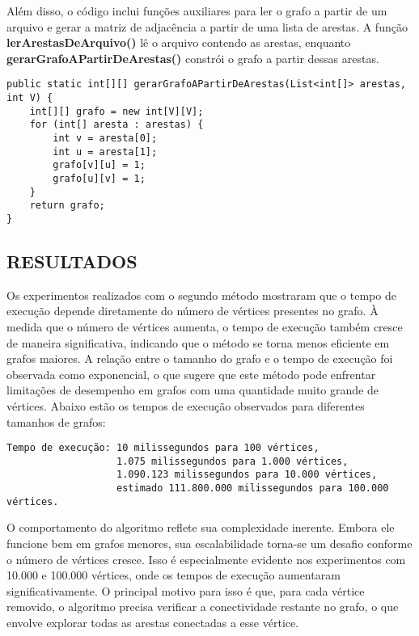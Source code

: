 Além disso, o código inclui funções auxiliares para ler o grafo a partir de um arquivo e gerar a matriz de adjacência a partir de uma lista de arestas. A função \textbf{lerArestasDeArquivo()} lê o arquivo contendo as arestas, enquanto \textbf{gerarGrafoAPartirDeArestas()} constrói o grafo a partir dessas arestas.

\begin{verbatim}
public static int[][] gerarGrafoAPartirDeArestas(List<int[]> arestas, int V) {
    int[][] grafo = new int[V][V];
    for (int[] aresta : arestas) {
        int v = aresta[0];
        int u = aresta[1];
        grafo[v][u] = 1;
        grafo[u][v] = 1;
    }
    return grafo;
}
\end{verbatim}

\subsection{\esp RESULTADOS}

Os experimentos realizados com o segundo método mostraram que o tempo de execução depende diretamente do número de vértices presentes no grafo. À medida que o número de vértices aumenta, o tempo de execução também cresce de maneira significativa, indicando que o método se torna menos eficiente em grafos maiores. A relação entre o tamanho do grafo e o tempo de execução foi observada como exponencial, o que sugere que este método pode enfrentar limitações de desempenho em grafos com uma quantidade muito grande de vértices. Abaixo estão os tempos de execução observados para diferentes tamanhos de grafos:

\begin{verbatim}
Tempo de execução: 10 milissegundos para 100 vértices,
                   1.075 milissegundos para 1.000 vértices,
                   1.090.123 milissegundos para 10.000 vértices,
                   estimado 111.800.000 milissegundos para 100.000 vértices.
\end{verbatim}

O comportamento do algoritmo reflete sua complexidade inerente. Embora ele funcione bem em grafos menores, sua escalabilidade torna-se um desafio conforme o número de vértices cresce. Isso é especialmente evidente nos experimentos com 10.000 e 100.000 vértices, onde os tempos de execução aumentaram significativamente. O principal motivo para isso é que, para cada vértice removido, o algoritmo precisa verificar a conectividade restante no grafo, o que envolve explorar todas as arestas conectadas a esse vértice.

